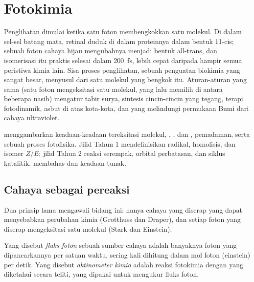 \chapter{Fotokimia}\label{ch:b3:photochemistry}

Penglihatan dimulai ketika satu foton membengkokkan satu molekul. Di dalam
sel-sel batang mata, retinal duduk di dalam proteinnya dalam bentuk 11-cis;
sebuah foton cahaya hijau mengubahnya menjadi bentuk all-trans, dan isomerisasi
itu praktis selesai dalam \qty{200}{fs}, lebih cepat daripada hampir semua
peristiwa kimia lain. Sisa proses penglihatan, sebuah penguatan biokimia yang
sangat besar, menyusul dari satu molekul yang bengkok itu. Aturan-aturan yang
sama (satu foton mengeksitasi satu molekul, yang lalu memilih di antara
beberapa nasib) mengatur tabir surya, sintesis cincin-cincin yang tegang,
terapi fotodinamik, asbut di atas kota-kota, dan  yang melindungi
permukaan Bumi dari cahaya ultraviolet.

\begin{recall}
 menggambarkan keadaan-keadaan tereksitasi
molekul, , ,  dan ,
pemadaman, serta  sebuah proses fotofisika. Jilid Tahun 1
mendefinisikan radikal, homolisis, dan isomer $Z$/$E$; jilid Tahun 2 reaksi
serempak, orbital perbatasan, dan siklus katalitik.
 membahas  dan keadaan tunak.
\end{recall}

\section{Cahaya sebagai pereaksi}

Dua prinsip lama mengawali bidang ini: hanya cahaya yang diserap yang dapat
menyebabkan perubahan kimia (Grotthuss dan Draper), dan setiap foton yang
diserap mengeksitasi satu molekul (Stark dan Einstein).

\begin{definition}\label{def:b3:photochemistry:photon-flux}
Yang disebut \emph{fluks foton} sebuah sumber cahaya adalah
banyaknya foton yang dipancarkannya per satuan waktu, sering kali dihitung
dalam mol foton (einstein) per detik. Yang disebut \emph{aktinometer
kimia} adalah reaksi fotokimia dengan  yang diketahui secara teliti, yang dipakai untuk mengukur fluks foton.
\end{definition}


